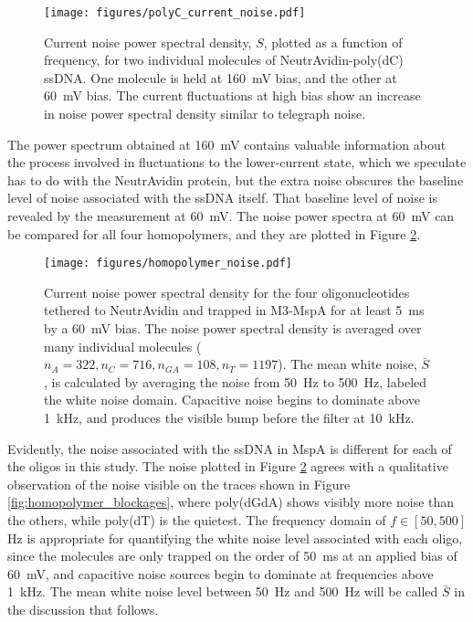 \begin{figure}[h]
\begin{centering}
\texttt{[image: figures/polyC\_current\_noise.pdf]}
\caption[Current fluctuations for single molecule poly(dC) ssDNA]{Current noise power spectral density, $S$, plotted as a function of frequency, for two individual molecules of NeutrAvidin-poly(dC) ssDNA.  One molecule is held at \SI{160}{\mV} bias, and the other at \SI{60}{\mV} bias.  The current fluctuations at high bias show an increase in noise power spectral density similar to telegraph noise.}
\label{fig:polyC_fluctuations}
\end{centering}
\end{figure}

The power spectrum obtained at \SI{160}{\mV} contains valuable information about the process involved in fluctuations to the lower-current state, which we speculate has to do with the NeutrAvidin protein, but the extra noise obscures the baseline level of noise associated with the ssDNA itself.  That baseline level of noise is revealed by the measurement at \SI{60}{\mV}.  The noise power spectra at \SI{60}{\mV} can be compared for all four homopolymers, and they are plotted in Figure \ref{fig:homopolymer_fluctuations}.

\begin{figure}[h]
\begin{centering}
\texttt{[image: figures/homopolymer\_noise.pdf]}
\caption[Current fluctuations for all homopolymer ssDNA]{Current noise power spectral density for the four oligonucleotides tethered to NeutrAvidin and trapped in M3-MspA for at least \SI{5}{\ms} by a \SI{60}{\mV} bias.  The noise power spectral density is averaged over many individual molecules ($n_A=322, n_C=716, n_{GA}=108, n_T=1197$).  The mean white noise, $\bar{S}$, is calculated by averaging the noise from \SI{50}{\Hz} to \SI{500}{\Hz}, labeled the white noise domain.  Capacitive noise begins to dominate above \SI{1}{\kHz}, and produces the visible bump before the filter at \SI{10}{\kHz}.}
\label{fig:homopolymer_fluctuations}
\end{centering}
\end{figure}

Evidently, the noise associated with the ssDNA in MspA is different for each of the oligos in this study.  The noise plotted in Figure \ref{fig:homopolymer_fluctuations} agrees with a qualitative observation of the noise visible on the traces shown in Figure \ref{fig:homopolymer_blockages}, where poly(dGdA) shows visibly more noise than the others, while poly(dT) is the quietest.  The frequency domain of $f \in [50, 500]$\si{\Hz} is appropriate for quantifying the white noise level associated with each oligo, since the molecules are only trapped on the order of \SI{50}{\ms} at an applied bias of \SI{60}{\mV}, and capacitive noise sources begin to dominate at frequencies above \SI{1}{\kHz}.  The mean white noise level between \SI{50}{\Hz} and \SI{500}{\Hz} will be called $\bar{S}$ in the discussion that follows.

